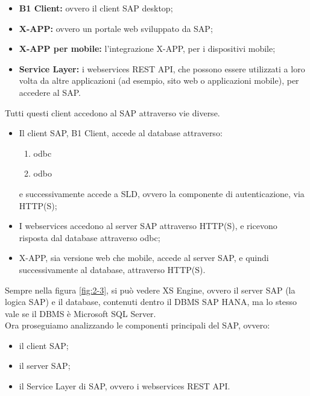 \begin{itemize}
	\item \textbf{B1 Client:} ovvero il client SAP desktop;
	\item \textbf{X-APP:} ovvero un portale web sviluppato da SAP;
	\item \textbf{X-APP per mobile:} l'integrazione X-APP, per i dispositivi mobile;
	\item \textbf{Service Layer:} i webservices REST API, che possono essere utilizzati a loro volta da altre applicazioni (ad esempio, sito web o applicazioni mobile), per accedere al SAP.
\end{itemize}
Tutti questi client accedono al SAP attraverso vie diverse.
\begin{itemize}
		\item Il client SAP, B1 Client, accede al database attraverso:
		\begin{enumerate}
			\item \gls{odbc} 
			\item \gls{odbo}
		\end{enumerate}
		e successivamente accede a SLD, ovvero la componente di autenticazione, via HTTP(S);
\item I webservices accedono al server SAP attraverso HTTP(S), e ricevono risposta dal database attraverso \gls{odbc};
	\item X-APP, sia versione web che mobile, accede al server SAP, e quindi successivamente al database, attraverso HTTP(S).
\end{itemize}
Sempre nella figura \ref{fig:2-3}, si può vedere XS Engine, ovvero il server SAP (la logica SAP) e il database, contenuti dentro il DBMS SAP HANA, ma lo stesso vale se il DBMS è Microsoft SQL Server.\\
Ora proseguiamo analizzando le componenti principali del SAP, ovvero:
\begin{itemize}
	\item il client SAP;
	\item il server SAP;
	\item il Service Layer di SAP, ovvero i webservices REST API.
\end{itemize}
\newpage
